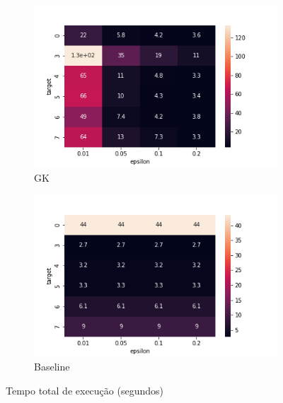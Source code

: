 \documentclass[11pt]{article}
\begin{document}
\begin{figure}[ht]
\begin{subfigure}{.5\textwidth}
  \centering
  \includegraphics[width=.9\linewidth]{../../img/QUANTIL_heatmap_TEMPO_EXEC_SEG.png}
  \caption{GK}
  \label{fig:sub-first}
\end{subfigure}
\begin{subfigure}{.5\textwidth}
  \centering
  \includegraphics[width=.9\linewidth]{../../img/QUANTIL_heatmap_TEMPO_EXEC_SEG_BASELINE.png}
  \caption{Baseline}
\end{subfigure}
\caption{Tempo total de execução (segundos)}
\end{figure}
\end{document}
